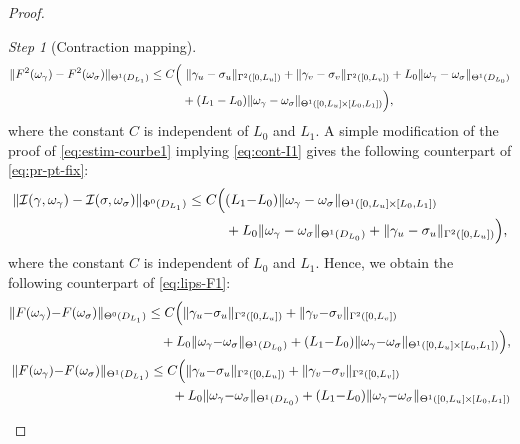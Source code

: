 \documentclass{article}
\newcommand{\I}{\mathcal{I}}
\newcommand{\PLH}{{\mkern-1mu\times\mkern-1mu}}
\newcommand{\Times}{\PLH}
\theoremstyle{remark}
\theoremstyle{prpart}
\newtheorem{proofpart}{Step}
\begin{document}
\begin{proof}
\begin{proofpart}[Contraction mapping]
    \small
    \begin{equation}\label{eq:lips-F-ext}
      \begin{split}
        \|F^2(\omega_\gamma)-F^2(\omega_\sigma)\|_{\Theta^{1}(D_{L_1})}\leq C \Big(&~\|\gamma_u-\sigma_u\|_{\Gamma^{2}([0,L_u])} + \|\gamma_v-\sigma_v\|_{\Gamma^{2}([0,L_v])} + L_0\|\omega_\gamma-\omega_\sigma\|_{\Theta^{1}(D_{L_0})}\\
        &+ (L_1-L_0)\|\omega_\gamma-\omega_\sigma\|_{\Theta^{1}([0,L_u]\Times[L_0,L_1])}\Big),
      \end{split}
    \end{equation}
    \normalsize
    where the constant $C$ is independent of $L_0$ and $L_1$. 
    A simple modification of the proof of \eqref{eq:estim-courbe1} implying \eqref{eq:cont-I1} gives the following counterpart of \eqref{eq:pr-pt-fix}:
    \begin{align*}
      \|\I(\gamma,\omega_\gamma) - \I(\sigma,\omega_\sigma)\|_{\Phi^{0}(D_{L_1})} \leq C\Big(&(L_1{-}L_0)\|\omega_\gamma-\omega_\sigma\|_{\Theta^{1}([0,L_u]\Times[L_0,L_1])} \\
      &+L_0 \|\omega_\gamma-\omega_\sigma\|_{\Theta^{1}(D_{L_0})}+ \|\gamma_u-\sigma_u\|_{\Gamma^{2}([0,L_u])}\Big),
    \end{align*}
    where the constant $C$ is independent of $L_0$ and $L_1$. Hence, we obtain the following counterpart of \eqref{eq:lips-F1}:
    \begin{subequations}\label{eq:lips-F1bis}
      \begin{align}\label{eq:lips-F1bis1}
        \begin{split}
          \|F(\omega_\gamma){-}F(\omega_\sigma)\|_{\Theta^{0}(D_{L_1})}&\leq C\Big( \|\gamma_u{-}\sigma_u\|_{\Gamma^{2}([0,L_u])} + \|\gamma_v{-}\sigma_v\|_{\Gamma^{2}([0,L_v])}\\
          &\quad + L_0\|\omega_\gamma{-}\omega_\sigma\|_{\Theta^{1}(D_{L_0})}+ (L_1{-}L_0)\|\omega_\gamma{-}\omega_\sigma\|_{\Theta^{1}([0,L_u]\Times[L_0,L_1])}\Big),
        \end{split}\\
        \begin{split}
          \|F(\omega_\gamma){-}F(\omega_\sigma)\|_{\Theta^{1}(D_{L_1})}&\leq C\Big( \|\gamma_u{-}\sigma_u\|_{\Gamma^{2}([0,L_u])} + \|\gamma_v{-}\sigma_v\|_{\Gamma^{2}([0,L_v])} \\
          &~~\quad+ L_0\|\omega_\gamma{-}\omega_\sigma\|_{\Theta^{1}(D_{L_0})} + (L_1{-}L_0)\|\omega_\gamma{-}\omega_\sigma\|_{\Theta^{1}([0,L_u]\Times[L_0,L_1])}\\

\end{split}
\end{align}
\end{subequations}
\end{proofpart}
\end{proof}
\end{document}
